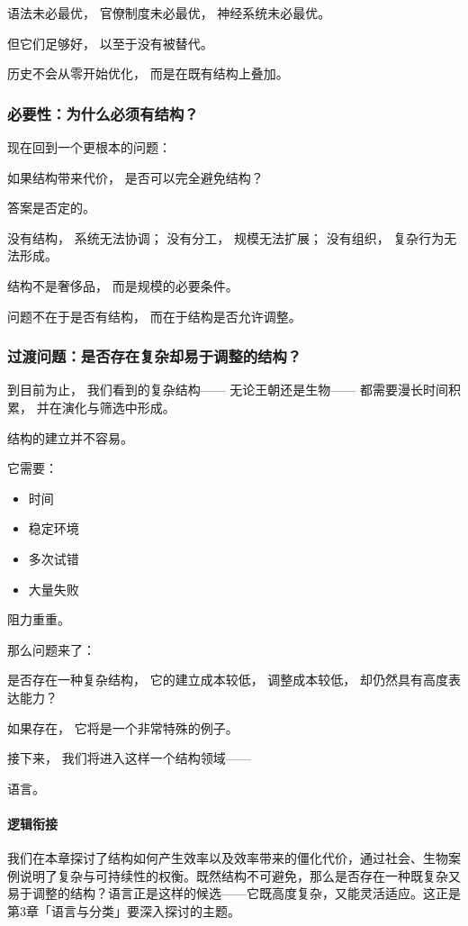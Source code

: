 \documentclass[../main.tex]{subfiles}
\begin{document}
语法未必最优，
官僚制度未必最优，
神经系统未必最优。

但它们足够好，
以至于没有被替代。

历史不会从零开始优化，
而是在既有结构上叠加。

\subsubsection*{必要性：为什么必须有结构？}

现在回到一个更根本的问题：

\begin{questionbox}
	如果结构带来代价，
	是否可以完全避免结构？
\end{questionbox}

答案是否定的。

没有结构，
系统无法协调；
没有分工，
规模无法扩展；
没有组织，
复杂行为无法形成。

结构不是奢侈品，
而是规模的必要条件。

问题不在于是否有结构，
而在于结构是否允许调整。

\subsubsection*{过渡问题：是否存在复杂却易于调整的结构？}

到目前为止，
我们看到的复杂结构——
无论王朝还是生物——
都需要漫长时间积累，
并在演化与筛选中形成。

结构的建立并不容易。

它需要：

\begin{itemize}
	\item 时间
	\item 稳定环境
	\item 多次试错
	\item 大量失败
\end{itemize}

阻力重重。

那么问题来了：

\begin{questionbox}
	是否存在一种复杂结构，
	它的建立成本较低，
	调整成本较低，
	却仍然具有高度表达能力？
\end{questionbox}

如果存在，
它将是一个非常特殊的例子。

接下来，
我们将进入这样一个结构领域——

语言。

\paragraph*{逻辑衔接}
我们在本章探讨了结构如何产生效率以及效率带来的僵化代价，通过社会、生物案例说明了复杂与可持续性的权衡。既然结构不可避免，那么是否存在一种既复杂又易于调整的结构？语言正是这样的候选——它既高度复杂，又能灵活适应。这正是第3章「语言与分类」要深入探讨的主题。

\end{document}
